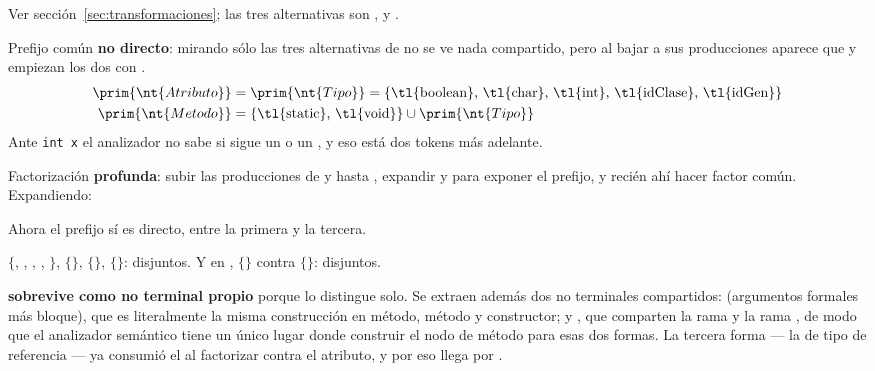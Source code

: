  Ver sección~\ref{sec:transformaciones}; las tres alternativas son
,  y .

 Prefijo común \textbf{no directo}: mirando sólo las tres alternativas de
 no se ve nada compartido, pero al bajar a sus producciones aparece que 
y  empiezan los dos con .
\begin{align*}
\prim{\nt{Atributo}} &= \prim{\nt{Tipo}} = \{\text{\tl{boolean}, \tl{char}, \tl{int}, \tl{idClase}, \tl{idGen}}\}\\
\prim{\nt{Metodo}} &= \{\text{\tl{static}, \tl{void}}\} \cup \prim{\nt{Tipo}}
\end{align*}
Ante \texttt{int x} el analizador no sabe si sigue un \tl{;} o un \tl{(}, y eso está dos tokens
más adelante.

 Factorización \textbf{profunda}: subir las producciones de  y
 hasta , expandir  y  para exponer el
prefijo, y recién ahí hacer factor común. Expandiendo:
\begin{producciones}
\end{producciones}
Ahora el prefijo   sí es directo, entre la primera y la tercera.

\begin{producciones}
\end{producciones}
$\{$, , , , $\}$, $\{$$\}$,
$\{$$\}$, $\{$$\}$: disjuntos. Y en , $\{$\tl{;}$\}$
contra $\{$\tl{(}$\}$: disjuntos.

 \textbf{sobrevive como no terminal propio} porque  lo distingue solo.
Se extraen además dos no terminales compartidos:  (argumentos formales más
bloque), que es literalmente la misma construcción en método, método  y constructor; y
, que comparten la rama  y la rama , de modo que el analizador
semántico tiene un único lugar donde construir el nodo de método para esas dos formas. La tercera
forma --- la de tipo de referencia --- ya consumió el  al factorizar contra el
atributo, y por eso llega por .

